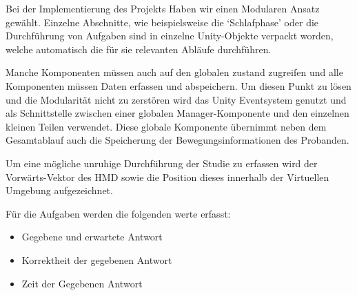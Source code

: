 Bei der Implementierung des Projekts Haben wir einen Modularen Ansatz gewählt. Einzelne Abschnitte, wie beispielsweise die `Schlafphase' oder die Durchführung von Aufgaben sind in einzelne Unity-Objekte verpackt worden, welche automatisch die für sie relevanten Abläufe durchführen. 

Manche Komponenten müssen auch auf den globalen zustand zugreifen und alle Komponenten müssen Daten erfassen und abspeichern. Um diesen Punkt zu lösen und die Modularität nicht zu zerstören wird das Unity Eventsystem genutzt und als Schnittstelle zwischen einer globalen Manager-Komponente und den einzelnen kleinen Teilen verwendet. 
Diese globale Komponente übernimmt neben dem Gesamtablauf auch die Speicherung der Bewegungsinformationen des Probanden. 

Um eine mögliche unruhige Durchführung der Studie zu erfassen wird der Vorwärts-Vektor des HMD sowie die Position dieses innerhalb der Virtuellen Umgebung aufgezeichnet.

Für die Aufgaben werden die folgenden werte erfasst:
\begin{itemize}
    \item Gegebene und erwartete Antwort
    \item Korrektheit der gegebenen Antwort
    \item Zeit der Gegebenen Antwort
\end{itemize}
